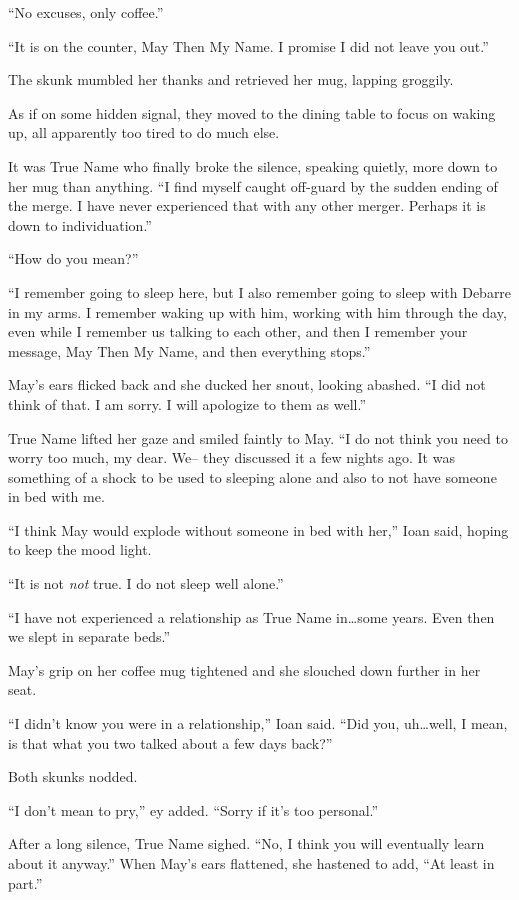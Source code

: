 ``No excuses, only coffee.''

``It is on the counter, May Then My Name. I promise I did not leave you out.''

The skunk mumbled her thanks and retrieved her mug, lapping groggily.

As if on some hidden signal, they moved to the dining table to focus on waking up, all apparently too tired to do much else.

It was True Name who finally broke the silence, speaking quietly, more down to her mug than anything. ``I find myself caught off-guard by the sudden ending of the merge. I have never experienced that with any other merger. Perhaps it is down to individuation.''

``How do you mean?''

``I remember going to sleep here, but I also remember going to sleep with Debarre in my arms. I remember waking up with him, working with him through the day, even while I remember us talking to each other, and then I remember your message, May Then My Name, and then everything stops.''

May's ears flicked back and she ducked her snout, looking abashed. ``I did not think of that. I am sorry. I will apologize to them as well.''

True Name lifted her gaze and smiled faintly to May. ``I do not think you need to worry too much, my dear. We-- they discussed it a few nights ago. It was something of a shock to be used to sleeping alone and also to not have someone in bed with me.

``I think May would explode without someone in bed with her,'' Ioan said, hoping to keep the mood light.

``It is not \emph{not} true. I do not sleep well alone.''

``I have not experienced a relationship as True Name in\ldots some years. Even then we slept in separate beds.''

May's grip on her coffee mug tightened and she slouched down further in her seat.

``I didn't know you were in a relationship,'' Ioan said. ``Did you, uh\ldots well, I mean, is that what you two talked about a few days back?''

Both skunks nodded.

``I don't mean to pry,'' ey added. ``Sorry if it's too personal.''

After a long silence, True Name sighed. ``No, I think you will eventually learn about it anyway.'' When May's ears flattened, she hastened to add, ``At least in part.''

